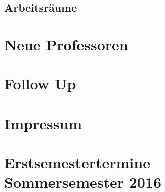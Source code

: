 \documentclass{fsinewsletter}
\begin{document}
\subsection{Arbeitsräume}

\vfill
\newpage
\section{Neue Professoren}

\vfill
\newpage


\section{Follow Up}


\vfill
\newpage
\section{Impressum}


%
\vfill
\newpage
\section{Erstsemestertermine Sommersemester 2016}

\end{document}
